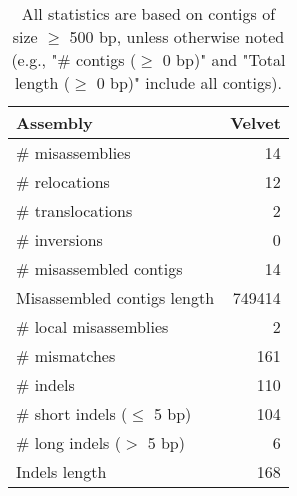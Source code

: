 \documentclass[12pt,a4paper]{article}
\begin{document}
\begin{table}[ht]
\begin{center}
\caption{All statistics are based on contigs of size $\geq$ 500 bp, unless otherwise noted (e.g., "\# contigs ($\geq$ 0 bp)" and "Total length ($\geq$ 0 bp)" include all contigs).}
\begin{tabular}{|l*{1}{|r}|}
\hline
Assembly & Velvet \\ \hline
\# misassemblies & 14 \\ \hline
\hspace{5mm}\# relocations & 12 \\ \hline
\hspace{5mm}\# translocations & 2 \\ \hline
\hspace{5mm}\# inversions & 0 \\ \hline
\# misassembled contigs & 14 \\ \hline
Misassembled contigs length & 749414 \\ \hline
\# local misassemblies & 2 \\ \hline
\# mismatches & 161 \\ \hline
\# indels & 110 \\ \hline
\hspace{5mm}\# short indels ($\leq$ 5 bp) & 104 \\ \hline
\hspace{5mm}\# long indels ($>$ 5 bp) & 6 \\ \hline
Indels length & 168 \\ \hline
\end{tabular}
\end{center}
\end{table}
\end{document}
